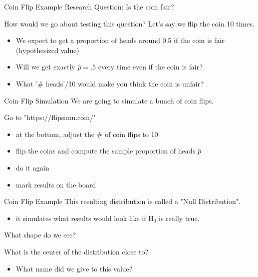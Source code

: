 \documentclass{beamer}
\begin{document}
\begin{frame}{Coin Flip Example}
Research Question: Is the coin fair? \vspace{12mm}

How would we go about testing this question? Let's say we flip the coin 10 times.
\begin{itemize}
    \item We expect to get a proportion of heads around 0.5 if the coin is fair (hypothesized value)
    \item Will we get exactly $\widehat{p} = .5$ every time even if the coin is fair?
    \item What '\# heads'/10 would make you think the coin is unfair?
\end{itemize}
\end{frame}

\begin{frame}{Coin Flip Simulation}
We are going to simulate a bunch of coin flips. \vspace{14mm}

Go to "https://flipsimu.com/"
\begin{itemize}
    \item at the bottom, adjust the \# of coin flips to 10
    \item flip the coins and compute the sample proportion of heads $\widehat{p}$
    \item do it again
    \item mark results on the board
\end{itemize}
    
\end{frame}

\begin{frame}{Coin Flip Example}
This resulting distribution is called a "Null Distribution".
\begin{itemize}
    \item it simulates what results would look like if H$_0$ is really true.
\end{itemize} \vspace{8mm}

What shape do we see? \vspace{8mm}

What is the center of the distribution close to?
\begin{itemize}
    \item What name did we give to this value?
\end{itemize}\vspace{8mm}
\end{frame}
\end{document}
